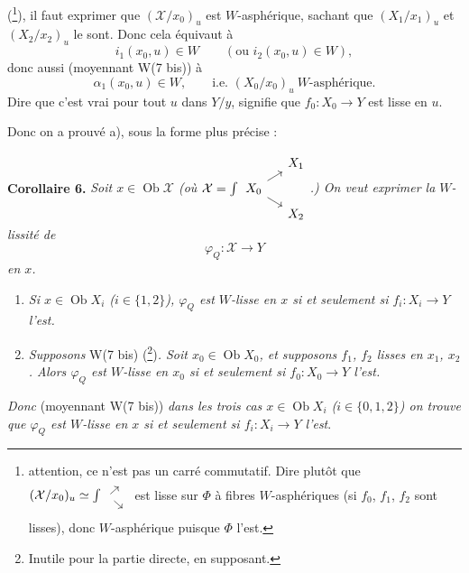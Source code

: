 \documentclass[11pt]{article}
\newcommand{\printedpage}[1]{\marginpar{\footnotesize p.~#1}}
\newcommand{\msp}[1]{\marginpar{\footnotesize [#1]}}
\newcommand{\Ob}{\operatorname{Ob}}
\begin{document}
\printedpage{108}
(\footnote[107]{attention, ce n'est pas un carré commutatif. Dire plutôt que $(\mathcal{X}/x_0)_u \simeq \int \begin{tikzcd}[ampersand replacement=\&, row sep=0.4em, column sep=0.4em, baseline=(\tikzcdmatrixname-2-1.base)] \& {} \\ {} \ar[ur]\ar[dr] \& \\ \& {} \end{tikzcd}$ est lisse sur $\Phi$ à fibres $W$-asphériques (si $f_0$, $f_1$, $f_2$ sont lisses), donc $W$-asphérique puisque $\Phi$ l'est.}), il faut exprimer que $(\mathcal{X}/x_0)_u$ est $W$-asphérique, sachant que $(X_1/x_1)_u$ et $(X_2/x_2)_u$ le sont. Donc cela équivaut à %
\[
i_1(x_0,u) \in W \qquad (\text{ou } i_2(x_0,u) \in W),
\]
donc aussi (moyennant W(7 bis)) à
\msp{page 157}
\[
\alpha_1(x_0,u) \in W, \qquad \text{i.e. } (X_0/x_0)_u \ W\text{-asphérique.}
\]
Dire que c'est vrai pour tout $u$ dans $Y/y$, signifie que $f_0 : X_0 \longrightarrow Y$ est lisse en $u$.

Donc on a prouvé a), sous la forme plus précise :

\textbf{Corollaire 6.} \textit{Soit $x \in \Ob \mathcal{X}$ (où $\mathcal{X} = \int \begin{tikzcd}[ampersand replacement=\&, row sep=tiny, column sep=small, baseline=(\tikzcdmatrixname-2-1.base)] \& X_1 \\ X_0 \ar[ur]\ar[dr] \& \\ \& X_2 \end{tikzcd}$.) On veut exprimer la $W$-lissité de}
\[
\varphi_Q : \mathcal{X} \longrightarrow Y
\]
\textit{en $x$.}

\begin{enumerate}[label={}, leftmargin=2.5em]
\item[\textit{a)}] \textit{Si $x \in \Ob X_i$ ($i \in \{1,2\}$), $\varphi_Q$ est $W$-lisse en $x$ si et seulement si $f_i : X_i \longrightarrow Y$ l'est.}
\item[\textit{b)}] \textit{Supposons} \textup{W(7 bis)} (\footnote[108]{Inutile pour la partie directe, en supposant.})\textit{. Soit $x_0 \in \Ob X_0$, et supposons $f_1$, $f_2$ lisses en $x_1$, $x_2$. Alors $\varphi_Q$ est $W$-lisse en $x_0$ si et seulement si $f_0 : X_0 \longrightarrow Y$ l'est.}
\end{enumerate}

\textit{Donc} (moyennant W(7 bis)) \textit{dans les trois cas $x \in \Ob X_i$ ($i \in \{0,1,2\}$) on trouve que $\varphi_Q$ est $W$-lisse en $x$ si et seulement si $f_i : X_i \longrightarrow Y$ l'est}.
\end{document}
